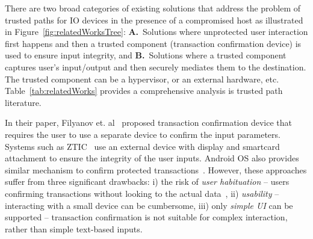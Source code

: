 There are two broad categories of existing solutions that address the problem of trusted paths for IO devices in the presence of a compromised host as illustrated in Figure~\ref{fig:relatedWorksTree}: \textbf{A.}~Solutions where unprotected user interaction first happens and then a trusted component (transaction confirmation device) is used to ensure input integrity,
and \textbf{B.}~Solutions where a trusted component captures user's input/output and then securely mediates them to the destination. The trusted component can be a hypervisor, or an external hardware, etc. Table~\ref{tab:relatedWorks} provides a comprehensive analysis is trusted path literature.

 In their paper, Filyanov et. al~\cite{filyanov2011uni} proposed transaction confirmation device that requires the user to use a separate device to confirm the input parameters. Systems such as ZTIC~\cite{weigold2011secure} use an external device with display and smartcard attachment to ensure the integrity of the user inputs. Android OS also provides similar mechanism to confirm protected transactions~\cite{android_confirm}. 
However, these approaches suffer from three significant drawbacks: i) the risk of \emph{user habituation} -- users confirming transactions without looking to the actual data~\cite{anderson2016warning},
ii) \emph{usability} -- interacting with a small device can be cumbersome, iii) only \emph{simple UI} can be supported -- transaction confirmation is not suitable for complex interaction, rather than simple text-based inputs.


